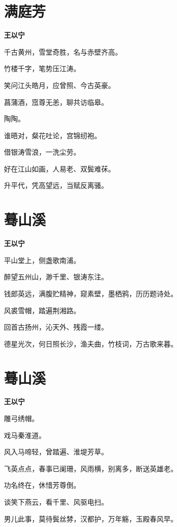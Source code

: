 \documentclass[12pt,a4paper]{ctexbook}
\begin{document}
\section{满庭芳}
\textbf{王以宁}\par\vspace{0.5em}
千古黄州，雪堂奇胜，名与赤壁齐高。\par
竹楼千字，笔势压江涛。\par
笑问江头皓月，应曾照、今古英豪。\par
菖蒲酒，窊尊无恙，聊共访临皋。\par
陶陶。\par
谁晤对，粲花吐论，宫锦纫袍。\par
借银涛雪浪，一洗尘劳。\par
好在江山如画，人易老、双鬓难茠。\par
升平代，凭高望远，当赋反离骚。\par

\section{蓦山溪}
\textbf{王以宁}\par\vspace{0.5em}
平山堂上，侧盏歌南浦。\par
醉望五州山，渺千里、银涛东注。\par
钱郎英远，满腹贮精神，窥素壁，墨栖鸦，历历题诗处。\par
风裘雪帽，踏遍荆湘路。\par
回首古扬州，沁天外、残霞一缕。\par
德星光次，何日照长沙，渔夫曲，竹枝词，万古歌来暮。\par

\section{蓦山溪}
\textbf{王以宁}\par\vspace{0.5em}
雕弓绣帽。\par
戏马秦淮道。\par
风入马啼轻，曾踏遍、淮堤芳草。\par
飞英点点，春事已阑珊，风雨横，别离多，断送英雄老。\par
功名终在，休惜芳尊倒。\par
谈笑下燕云，看千里、风驱电扫。\par
男儿此事，莫待鬓丝棼，汉都护，万年觞，玉殿春风早。\par
\end{document}
